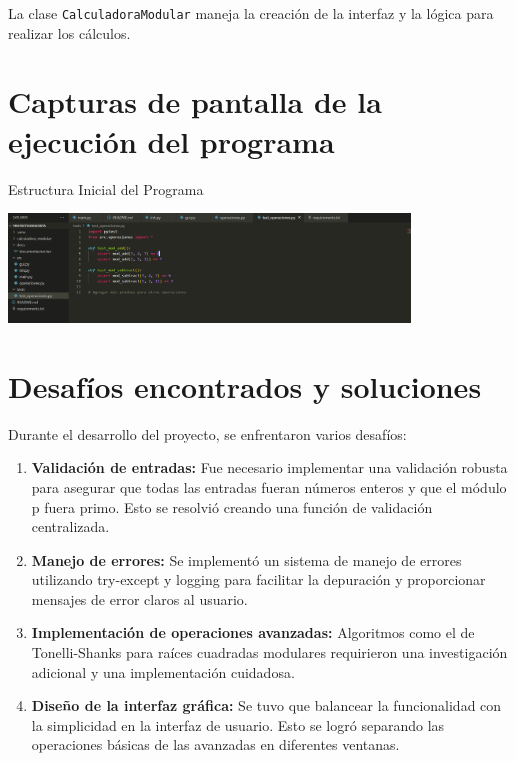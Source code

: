 \documentclass{article}
\begin{document}
La clase \texttt{CalculadoraModular} maneja la creación de la interfaz y la lógica para realizar los cálculos.

\section{Capturas de pantalla de la ejecución del programa}
Estructura Inicial del Programa

\includegraphics[width=0.8\textwidth]{Capturita1.png}




\section{Desafíos encontrados y soluciones}

Durante el desarrollo del proyecto, se enfrentaron varios desafíos:

\begin{enumerate}
    \item \textbf{Validación de entradas:} Fue necesario implementar una validación robusta para asegurar que todas las entradas fueran números enteros y que el módulo p fuera primo. Esto se resolvió creando una función de validación centralizada.
    
    \item \textbf{Manejo de errores:} Se implementó un sistema de manejo de errores utilizando try-except y logging para facilitar la depuración y proporcionar mensajes de error claros al usuario.
    
    \item \textbf{Implementación de operaciones avanzadas:} Algoritmos como el de Tonelli-Shanks para raíces cuadradas modulares requirieron una investigación adicional y una implementación cuidadosa.
    
    \item \textbf{Diseño de la interfaz gráfica:} Se tuvo que balancear la funcionalidad con la simplicidad en la interfaz de usuario. Esto se logró separando las operaciones básicas de las avanzadas en diferentes ventanas.
\end{enumerate}
\end{document}
